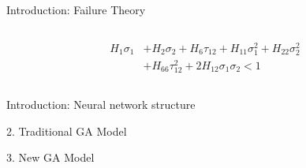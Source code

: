 \documentclass{beamer}
\begin{document}
\begin{frame}{Introduction: Failure Theory }
\begin{columns}[c]
\begin{column}{0.6\textwidth}
\begin{itemize}
		 \begingroup
		 \small
		 \begin{equation*} 
		 \begin{split}
			H_1 \sigma_1  & + H_2 \sigma_2 + H_6 \tau_{12} + H_{11}\sigma_1^2 + H_{22} \sigma_2^2 \\
						  & + H_{66}  \tau_{12}^2 + 2H_{12}\sigma_1\sigma_2 < 1
		 \end{split}
		\end{equation*}
		\endgroup
		\end{itemize}
    \end{column}
\end{columns}
\end{frame}

\begin{frame}{Introduction: Neural network structure}
	
\end{frame}

\begin{frame}{2. Traditional GA Model}
	
\end{frame}

\begin{frame}{3. New GA Model}
	
\end{frame}
\end{document}

